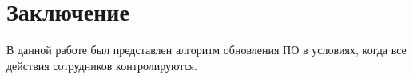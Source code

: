 \section*{Заключение}

В данной работе был представлен алгоритм обновления ПО в условиях, когда все действия сотрудников контролируются.
